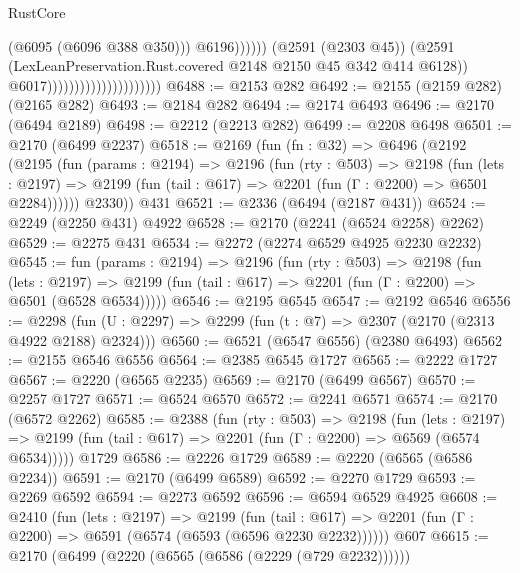 \begin{lexlean}{RustCore}
\begin{coremodule}
                                                            (@6095 (@6096 @388 @350)))
                                                          @6196))))))
                                              (@2591 (@2303 @45))
                                              (@2591
                                                (LexLeanPreservation.Rust.covered
                                                  @2148
                                                  @2150
                                                  @45
                                                  @342
                                                  @414
                                                  @6128))
                                              @6017)))))))))))))))))))))
@6488 := @2153 @282
@6492 := @2155 (@2159 @282) (@2165 @282)
@6493 := @2184 @282
@6494 := @2174 @6493
@6496 := @2170 (@6494 @2189)
@6498 := @2212 (@2213 @282)
@6499 := @2208 @6498
@6501 := @2170 (@6499 @2237)
@6518 := @2169
    (fun (fn : @32) =>
    @6496
      (@2192
        (@2195
          (fun (params : @2194) =>
          @2196
            (fun (rty : @503) =>
            @2198
              (fun (lets : @2197) =>
              @2199 (fun (tail : @617) => @2201 (fun (Γ : @2200) => @6501 @2284))))))
        @2330))
    @431
@6521 := @2336 (@6494 (@2187 @431))
@6524 := @2249 (@2250 @431) @4922
@6528 := @2170 (@2241 (@6524 @2258) @2262)
@6529 := @2275 @431
@6534 := @2272 (@2274 @6529 @4925 @2230 @2232)
@6545 := fun (params : @2194) =>
  @2196
    (fun (rty : @503) =>
    @2198
      (fun (lets : @2197) =>
      @2199 (fun (tail : @617) => @2201 (fun (Γ : @2200) => @6501 (@6528 @6534)))))
@6546 := @2195 @6545
@6547 := @2192 @6546
@6556 := @2298 (fun (U : @2297) => @2299 (fun (t : @7) => @2307 (@2170 (@2313 @4922 @2188) @2324)))
@6560 := @6521 (@6547 @6556) (@2380 @6493)
@6562 := @2155 @6546 @6556
@6564 := @2385 @6545 @1727
@6565 := @2222 @1727
@6567 := @2220 (@6565 @2235)
@6569 := @2170 (@6499 @6567)
@6570 := @2257 @1727
@6571 := @6524 @6570
@6572 := @2241 @6571
@6574 := @2170 (@6572 @2262)
@6585 := @2388
    (fun (rty : @503) =>
    @2198
      (fun (lets : @2197) =>
      @2199 (fun (tail : @617) => @2201 (fun (Γ : @2200) => @6569 (@6574 @6534)))))
    @1729
@6586 := @2226 @1729
@6589 := @2220 (@6565 (@6586 @2234))
@6591 := @2170 (@6499 @6589)
@6592 := @2270 @1729
@6593 := @2269 @6592
@6594 := @2273 @6592
@6596 := @6594 @6529 @4925
@6608 := @2410
    (fun (lets : @2197) =>
    @2199
      (fun (tail : @617) => @2201 (fun (Γ : @2200) => @6591 (@6574 (@6593 (@6596 @2230 @2232))))))
    @607
@6615 := @2170 (@6499 (@2220 (@6565 (@6586 (@2229 (@729 @2232))))))

\end{coremodule}
\end{lexlean}
